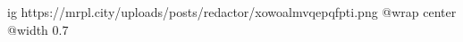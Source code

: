  
 
 
 
 

\ifcmt
  ig https://mrpl.city/uploads/posts/redactor/xowoalmvqepqfpti.png
  @wrap center
  @width 0.7
\fi
